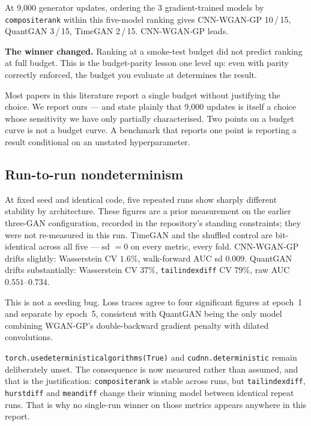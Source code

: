 \documentclass[11pt,a4paper]{article}
\makeatletter
\DeclareRobustCommand{\_}{\ifmmode\nfss@text{\textunderscore}\else\textunderscore\allowbreak\fi}
\makeatother
\begin{document}
At 9,000 generator updates, ordering the 3 gradient-trained models by \texttt{composite\_rank} within this five-model ranking gives CNN-WGAN-GP 10\,/\,15, QuantGAN 3\,/\,15, TimeGAN 2\,/\,15. CNN-WGAN-GP leads.

\textbf{The winner changed.} Ranking at a smoke-test budget did not predict ranking at full budget. This is the budget-parity lesson one level up: even with parity correctly enforced, the budget you evaluate at determines the result.

Most papers in this literature report a single budget without justifying the choice. We report ours --- and state plainly that 9,000 updates is itself a choice whose sensitivity we have only partially characterised. Two points on a budget curve is not a budget curve. A benchmark that reports one point is reporting a result conditional on an unstated hyperparameter.

\subsection{Run-to-run nondeterminism}
\label{sec:nondeterminism}
At fixed seed and identical code, five repeated runs show sharply different stability by architecture. These figures are a prior measurement on the earlier three-GAN configuration, recorded in the repository's standing constraints; they were not re-measured in this run. TimeGAN and the shuffled control are bit-identical across all five --- sd $=0$ on every metric, every fold. CNN-WGAN-GP drifts slightly: Wasserstein CV $1.6\%$, walk-forward AUC sd $0.009$. QuantGAN drifts substantially: Wasserstein CV $37\%$, \texttt{tail\_index\_diff} CV $79\%$, raw AUC $0.551$--$0.734$.

This is not a seeding bug. Loss traces agree to four significant figures at epoch~1 and separate by epoch~5, consistent with QuantGAN being the only model combining WGAN-GP's double-backward gradient penalty with dilated convolutions.

\texttt{torch.use\_deterministic\_algorithms(True)} and \texttt{cudnn.deterministic} remain deliberately unset. The consequence is now measured rather than assumed, and that is the justification: \texttt{composite\_rank} is stable across runs, but \texttt{tail\_index\_diff}, \texttt{hurst\_diff} and \texttt{mean\_diff} change their winning model between identical repeat runs. That is why no single-run winner on those metrics appears anywhere in this report.
\end{document}
